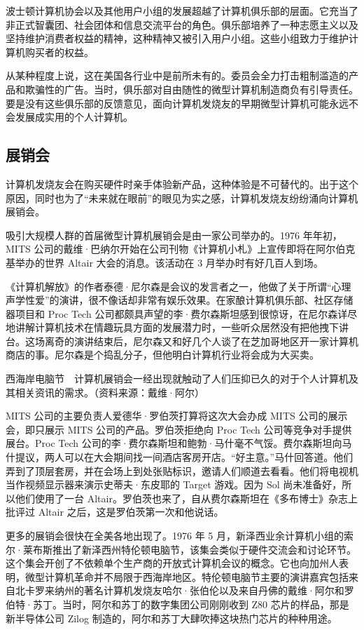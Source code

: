 \documentclass[12pt,UTF8]{ctexbook}
\begin{document}
波士顿计算机协会以及其他用户小组的发展超越了计算机俱乐部的层面。它充当了非正式智囊团、社会团体和信息交流平台的角色。俱乐部培养了一种志愿主义以及坚持维护消费者权益的精神，这种精神又被引入用户小组。这些小组致力于维护计算机购买者的权益。

从某种程度上说，这在美国各行业中是前所未有的。委员会全力打击粗制滥造的产品和欺骗性的广告。当时，俱乐部对自由随性的微型计算机制造商负有引导责任。要是没有这些俱乐部的反馈意见，面向计算机发烧友的早期微型计算机可能永远不会发展成实用的个人计算机。





\subsection{展销会}


计算机发烧友会在购买硬件时亲手体验新产品，这种体验是不可替代的。出于这个原因，同时也为了“未来就在眼前”的眼见为实之感，计算机发烧友纷纷涌向计算机展销会。

吸引大规模人群的首届微型计算机展销会是由一家公司举办的。1976 年年初，MITS 公司的戴维·巴纳尔开始在公司刊物《计算机小札》上宣传即将在阿尔伯克基举办的世界 Altair 大会的消息。该活动在 3 月举办时有好几百人到场。

《计算机解放》的作者泰德·尼尔森是会议的发言者之一，他做了关于所谓“心理声学性爱”的演讲，很不像话却非常有娱乐效果。在家酿计算机俱乐部、社区存储器项目和 Proc Tech 公司都颇具声望的李·费尔森斯坦感到很惊讶，在尼尔森详尽地讲解计算机技术在情趣玩具方面的发展潜力时，一些听众居然没有把他拽下讲台。这场离奇的演讲结束后，尼尔森又和好几个人谈了在芝加哥地区开一家计算机商店的事。尼尔森是个捣乱分子，但他明白计算机行业将会成为大买卖。



西海岸电脑节　计算机展销会一经出现就触动了人们压抑已久的对于个人计算机及其相关资讯的需求。（资料来源：戴维·阿尔）

MITS 公司的主要负责人爱德华·罗伯茨打算将这次大会办成 MITS 公司的展示会，即只展示 MITS 公司的产品。罗伯茨拒绝向 Proc Tech 公司等竞争对手提供展台。Proc Tech 公司的李·费尔森斯坦和鲍勃·马什毫不气馁。费尔森斯坦向马什提议，两人可以在大会期间找一间酒店客房开店。“好主意。”马什回答道。他们弄到了顶层套房，并在会场上到处张贴标识，邀请人们顺道去看看。他们将电视机当作视频显示器来演示史蒂夫·东皮耶的 Target 游戏。因为 Sol 尚未准备好，所以他们使用了一台 Altair。罗伯茨也来了，自从费尔森斯坦在《多布博士》杂志上批评过 Altair 之后，这是罗伯茨第一次和他说话。

更多的展销会很快在全美各地出现了。1976 年 5 月，新泽西业余计算机小组的索尔·莱布斯推出了新泽西州特伦顿电脑节，该集会类似于硬件交流会和讨论环节。这个集会开创了不依赖单个生产商的开放式计算机会议的概念。它也向加州人表明，微型计算机革命并不局限于西海岸地区。特伦顿电脑节主要的演讲嘉宾包括来自北卡罗来纳州的著名计算机发烧友哈尔·张伯伦以及来自丹佛的戴维·阿尔和罗伯特·苏丁。当时，阿尔和苏丁的数字集团公司刚刚收到 Z80 芯片的样品，那是新半导体公司 Zilog 制造的，阿尔和苏丁大肆吹捧这块热门芯片的种种用途。
\end{document}
